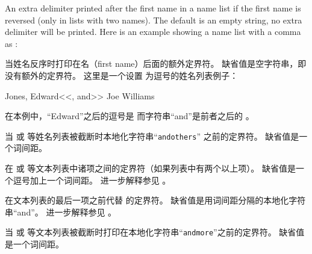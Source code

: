 \begin{ltxsyntax}
\CSdelimMark
An extra delimiter printed after the first name in a name list if the first name is reversed (only in lists with two names). The default is an empty string, \ie no extra delimiter will be printed. Here is an example showing a name list with a comma as :

当姓名反序时打印在名（first name）后面的额外定界符。
缺省值是空字符串，即没有额外的定界符。
这里是一个设置  为逗号的姓名列表例子：

\begin{ltxexample}
Jones, Edward<<, and>> Joe Williams
\end{ltxexample}
%
在本例中，“Edward”之后的逗号是  而字符串“and”是前者之后的 。

\CSdelimMark
当  或  等姓名列表被截断时本地化字符串“\texttt{andothers}” 之前的定界符。
缺省值是一个词间距。

\CSdelimMark
在  或  等文本列表中诸项之间的定界符（如果列表中有两个以上项）。
缺省值是一个逗号加上一个词间距。
进一步解释参见 。

\CSdelimMark
在文本列表的最后一项之前代替  的定界符。
缺省值是用词间距分隔的本地化字符串“and”。
进一步解释参见 。

\CSdelimMark
当  或  等文本列表被截断时打印在本地化字符串“\texttt{andmore}”之前的定界符。
缺省值是一个词间距。


\end{ltxsyntax}
